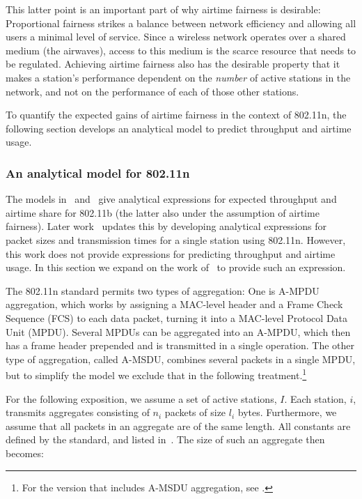 \documentclass[english]{scrartcl}
\begin{document}
This latter point is an important part of why airtime fairness is desirable:
Proportional fairness strikes a balance between network efficiency and allowing
all users a minimal level of service. Since a wireless network operates over a
shared medium (the airwaves), access to this medium is the scarce resource that
needs to be regulated. Achieving airtime fairness also has the desirable
property that it makes a station's performance dependent on the \emph{number} of
active stations in the network, and not on the performance of each of those
other stations.

To quantify the expected gains of airtime fairness in the context of 802.11n,
the following section develops an analytical model to predict throughput and
airtime usage.

\subsubsection{An analytical model for 802.11n}
\label{sec:orgdfe3ac0}
The models in \cite{heusse_performance_2003} and \cite{tan_time-based_2004} give
analytical expressions for expected throughput and airtime share for 802.11b
(the latter also under the assumption of airtime fairness). Later
work \cite{kim_adaptive_2015} updates this by developing analytical expressions
for packet sizes and transmission times for a single station using 802.11n.
However, this work does not provide expressions for predicting throughput and
airtime usage. In this section we expand on the work of \cite{kim_adaptive_2015}
to provide such an expression.

The 802.11n standard permits two types of aggregation: One is A-MPDU
aggregation, which works by assigning a MAC-level header and a Frame Check
Sequence (FCS) to each data packet, turning it into a MAC-level Protocol Data
Unit (MPDU). Several MPDUs can be aggregated into an A-MPDU, which then has a
frame header prepended and is transmitted in a single operation. The other type
of aggregation, called A-MSDU, combines several packets in a single MPDU, but to
simplify the model we exclude that in the following treatment.\footnote{For the version that includes A-MSDU aggregation, see
\cite{kim_adaptive_2015}.}

For the following exposition, we assume a set of active stations, \(I\). Each
station, \(i\), transmits aggregates consisting of \(n_i\) packets of size \(l_i\)
bytes. Furthermore, we assume that all packets in an aggregate are of the same
length. All constants are defined by the standard, and listed
in \cite{kim_adaptive_2015}. The size of such an aggregate then becomes:
\end{document}
